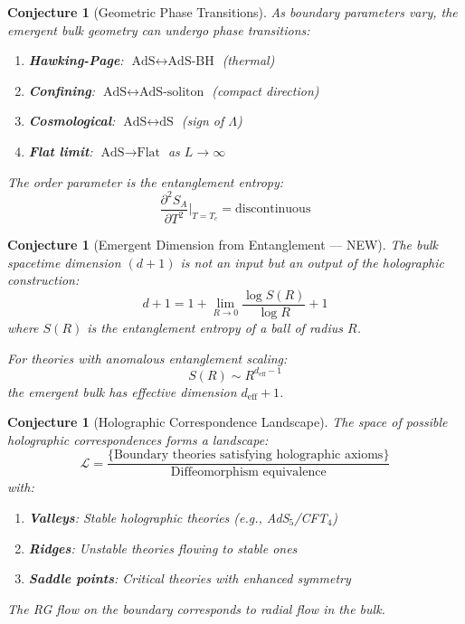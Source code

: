 \documentclass[12pt,a4paper]{article}
\newtheorem{conjecture}[theorem]{Conjecture}
\begin{document}
\begin{conjecture}[Geometric Phase Transitions]
As boundary parameters vary, the emergent bulk geometry can undergo phase transitions:
\begin{enumerate}
    \item \textbf{Hawking-Page}: $\text{AdS} \leftrightarrow \text{AdS-BH}$ (thermal)
    \item \textbf{Confining}: $\text{AdS} \leftrightarrow \text{AdS-soliton}$ (compact direction)
    \item \textbf{Cosmological}: $\text{AdS} \leftrightarrow \text{dS}$ (sign of $\Lambda$)
    \item \textbf{Flat limit}: $\text{AdS} \to \text{Flat}$ as $L \to \infty$
\end{enumerate}
The order parameter is the entanglement entropy:
\begin{equation}
\frac{\partial^2 S_A}{\partial T^2}\bigg|_{T=T_c} = \text{discontinuous}
\end{equation}
\end{conjecture}

\begin{conjecture}[Emergent Dimension from Entanglement --- NEW]
The bulk spacetime dimension $(d+1)$ is not an input but an \textit{output} of the holographic construction:
\begin{equation}
d + 1 = 1 + \lim_{R \to 0} \frac{\log S(R)}{\log R} + 1
\end{equation}
where $S(R)$ is the entanglement entropy of a ball of radius $R$.

For theories with anomalous entanglement scaling:
\begin{equation}
S(R) \sim R^{d_{\text{eff}} - 1}
\end{equation}
the emergent bulk has effective dimension $d_{\text{eff}} + 1$.
\end{conjecture}

\begin{conjecture}[Holographic Correspondence Landscape]
The space of possible holographic correspondences forms a landscape:
\begin{equation}
\mathcal{L} = \frac{\{\text{Boundary theories satisfying holographic axioms}\}}{\text{Diffeomorphism equivalence}}
\end{equation}
with:
\begin{enumerate}
    \item \textbf{Valleys}: Stable holographic theories (e.g., AdS$_5$/CFT$_4$)
    \item \textbf{Ridges}: Unstable theories flowing to stable ones
    \item \textbf{Saddle points}: Critical theories with enhanced symmetry
\end{enumerate}
The RG flow on the boundary corresponds to radial flow in the bulk.
\end{conjecture}
\end{document}

